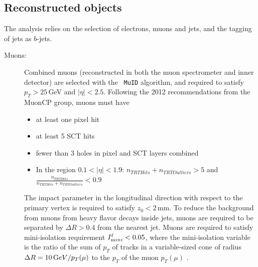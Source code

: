 \subsection{Reconstructed objects}\label{s:objects}

The analysis relies on the selection of electrons, muons and jets, and
the tagging of jets as $b$-jets.
\begin{description}
\item[Muons:] Combined muons (reconstructed in both the muon spectrometer
and inner detector) are selected with the \texttt{ MuID} algorithm, and 
required to satisfy $p_T>25$\,GeV and $|\eta|<2.5$.  Following the 2012 recommendations from the MuonCP group, muons must have
\begin{itemize}
\item at least one pixel hit
\item at least 5 SCT hits
\item fewer than 3 holes in pixel and SCT layers combined
\item In the region $0.1 < |\eta| < 1.9 $: $n_{TRT Hits} + n_{TRT Outliers} > 5$ and $\frac{n_{TRT Hits}}{n_{TRT Hits} + n_{TRT Outliers}} < 0.9$
\end{itemize}

The impact parameter
in the longitudinal direction with respect to the primary vertex is
required to satisfy $z_0<2$\,mm.  To reduce the background from
muons from heavy flavor decays inside jets, muons are required to be
separated by $\Delta R>0.4$ from the nearest jet. Muons are required to satisfy 
mini-isolation requirement $I^\ell_{\textrm mini}<0.05$, where
the mini-isolation variable is the ratio of the sum of $p_T$ of tracks
in a variable-sized cone of radius $\Delta R=10\,{\textrm GeV}/p_T(\mu)$ to the $p_T$ of the muon $p_T(\mu)$ \cite{topreco}. %


\end{description}
